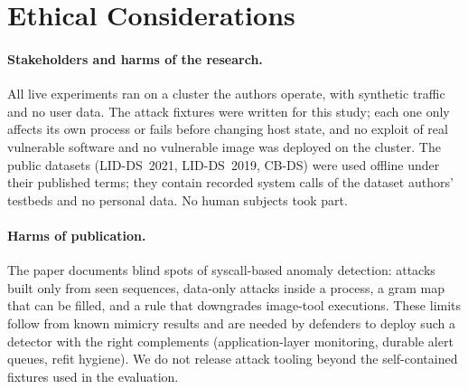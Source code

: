 \section*{Ethical Considerations}

\paragraph{Stakeholders and harms of the research.} All live experiments ran on a cluster the authors operate, with
synthetic traffic and no user data. The attack fixtures were written for this study; each one only affects its own
process or fails before changing host state, and no exploit of real vulnerable software and no vulnerable image was
deployed on the cluster. The public datasets (LID-DS~2021, LID-DS~2019, CB-DS) were used offline under their published
terms; they contain recorded system calls of the dataset authors' testbeds and no personal data. No human subjects took
part.

\paragraph{Harms of publication.} The paper documents blind spots of syscall-based anomaly detection: attacks built only
from seen sequences, data-only attacks inside a process, a gram map that can be filled, and a rule that downgrades
image-tool executions. These limits follow from known mimicry results and are needed by defenders to deploy such a
detector with the right complements (application-layer monitoring, durable alert queues, refit hygiene). We do not
release attack tooling beyond the self-contained fixtures used in the evaluation.
